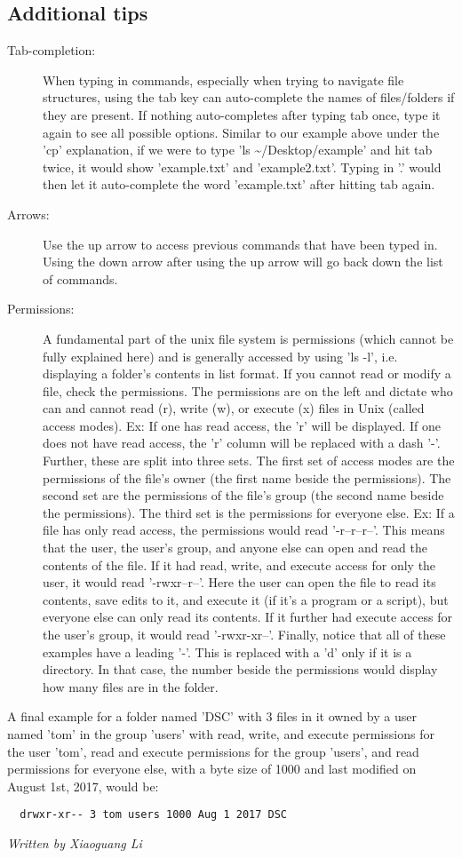 \documentclass[12pt,a4paper]{article}
\begin{document}
\subsection*{Additional tips}
\begin{description}
    \item[Tab-completion:] When typing in commands, especially when trying to navigate file structures, using the tab key can auto-complete the names of files/folders if they are present. If nothing auto-completes after typing tab once, type it again to see all possible options. Similar to our example above under the 'cp' explanation, if we were to type 'ls \textasciitilde{}/Desktop/example' and hit tab twice, it would show 'example.txt' and 'example2.txt'. Typing in '.' would then let it auto-complete the word 'example.txt' after hitting tab again.
    \item[Arrows:] Use the up arrow to access previous commands that have been typed in. Using the down arrow after using the up arrow will go back down the list of commands.
    \item[Permissions:] A fundamental part of the unix file system is permissions (which cannot be fully explained here) and is generally accessed by using 'ls -l', i.e. displaying a folder's contents in list format. If you cannot read or modify a file, check the permissions. The permissions are on the left and dictate who can and cannot read (r), write (w), or execute (x) files in Unix (called access modes). Ex: If one has read access, the 'r' will be displayed. If one does not have read access, the 'r' column will be replaced with a dash '-'. Further, these are split into three sets. The first set of access modes are the permissions of the file's owner (the first name beside the permissions). The second set are the permissions of the file's group (the second name beside the permissions). The third set is the permissions for everyone else. Ex: If a file has only read access, the permissions would read '-r--r--r--'. This means that the user, the user's group, and anyone else can open and read the contents of the file. If it had read, write, and execute access for only the user, it would read '-rwxr--r--'. Here the user can open the file to read its contents, save edits to it, and execute it (if it's a program or a script), but everyone else can only read its contents. If it further had execute access for the user's group, it would read '-rwxr-xr--'. Finally, notice that all of these examples have a leading '-'. This is replaced with a 'd' only if it is a directory. In that case, the number beside the permissions would display how many files are in the folder.
\end{description}
A final example for a folder named 'DSC' with 3 files in it owned by a user named 'tom' in the group 'users' with read, write, and execute permissions for the user 'tom', read and execute permissions for the group 'users', and read permissions for everyone else, with a byte size of 1000 and last modified on August 1st, 2017, would be:
\begin{verbatim}
  drwxr-xr-- 3 tom users 1000 Aug 1 2017 DSC
\end{verbatim}
\hfill \textit{Written by Xiaoguang Li}
\end{document}
